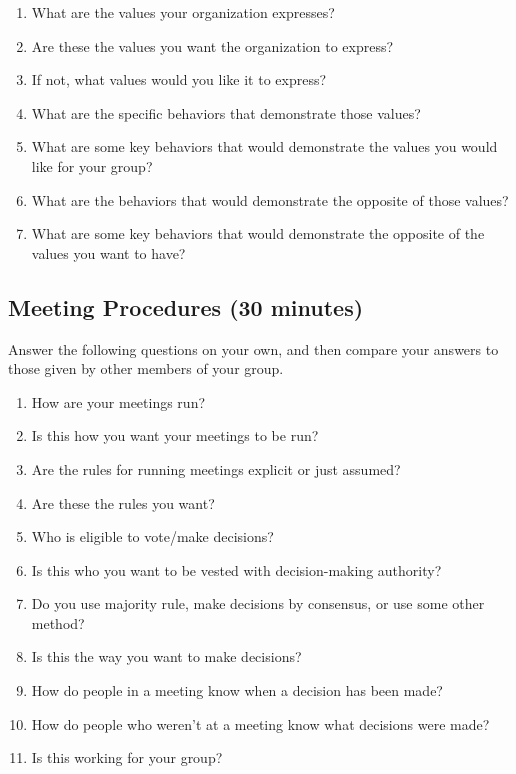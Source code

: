 \documentclass[10pt,statementpaper]{memoir}
\providecommand{\tightlist}{%
  \setlength{\itemsep}{0pt}\setlength{\parskip}{0pt}}
\begin{document}
\begin{enumerate}
\def\labelenumi{\arabic{enumi}.}
\tightlist
\item
  What are the values your organization expresses?
\item
  Are these the values you want the organization to express?
\item
  If not, what values would you like it to express?
\item
  What are the specific behaviors that demonstrate those values?
\item
  What are some key behaviors that would demonstrate the values you
  would like for your group?
\item
  What are the behaviors that would demonstrate the opposite of those
  values?
\item
  What are some key behaviors that would demonstrate the opposite of the
  values you want to have?
\end{enumerate}

\subsection{Meeting Procedures (30
minutes)}\label{meeting-procedures-30-minutes}

Answer the following questions on your own, and then compare your
answers to those given by other members of your group.

\begin{enumerate}
\def\labelenumi{\arabic{enumi}.}
\tightlist
\item
  How are your meetings run?
\item
  Is this how you want your meetings to be run?
\item
  Are the rules for running meetings explicit or just assumed?
\item
  Are these the rules you want?
\item
  Who is eligible to vote/make decisions?
\item
  Is this who you want to be vested with decision-making authority?
\item
  Do you use majority rule, make decisions by consensus, or use some
  other method?
\item
  Is this the way you want to make decisions?
\item
  How do people in a meeting know when a decision has been made?
\item
  How do people who weren't at a meeting know what decisions were made?
\item
  Is this working for your group?
\end{enumerate}
\end{document}
